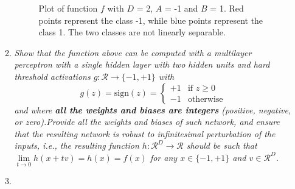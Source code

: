 \documentclass[12pt]{article}
\begin{document}
\begin{enumerate}[leftmargin=\labelsep]
\begin{enumerate}[label=\alph*)]
                    \begin{figure}[H]
                        \centering
                        
                        \caption{Plot of function $f$ with $D$ = 2, $A$ = -1 and $B$ = 1. Red points represent the class -1, while blue points represent the class 1. The two classes are not linearly separable.}
                        \label{fig:xor}
                    \end{figure}

                    \vspace{12pt}


              \item \textit{Show that the function above can be computed with a multilayer perceptron with a single hidden layer with two hidden units and hard threshold activations $g: \mathcal{R} \rightarrow \{-1, +1\}$ with}
                    \begin{equation*}
                        g(z) = \text{sign}(z) = \begin{cases}
                            +1 & \text{if } z \geq 0 \\
                            -1 & \text{otherwise}
                        \end{cases}
                    \end{equation*}
                    \textit{and where \textbf{all the weights and biases are integers} (positive, negative, or zero).Provide all the weights and biases of such network, and ensure that the resulting network is robust to infinitesimal perturbation of the inputs, i.e., the resulting function $h: \mathcal{R}^D \rightarrow \mathcal{R}$ should be such that $\lim\limits_{t \rightarrow 0} h(x + tv) = h(x) = f(x)$ for any $x \in \{-1, +1\}$ and $v \in \mathcal{R}^D$.}

                    \vspace{12pt}



              \item \textit{}
          \end{enumerate}
\end{enumerate}
\end{document}
